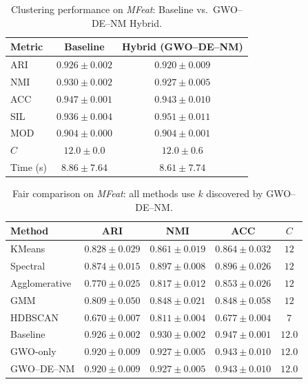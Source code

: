 \begin{table}[htbp]
\centering
\caption{Clustering performance on \textit{MFeat}: Baseline vs.\ GWO--DE--NM Hybrid.}
\label{tab:mfeat}
\begin{tabular}{lcc}
\toprule
Metric & Baseline & Hybrid (GWO--DE--NM) \\
\midrule
ARI & $\mathbf{0.926 \pm 0.002}$ & $0.920 \pm 0.009$ \\
NMI & $\mathbf{0.930 \pm 0.002}$ & $0.927 \pm 0.005$ \\
ACC & $\mathbf{0.947 \pm 0.001}$ & $0.943 \pm 0.010$ \\
SIL & $0.936 \pm 0.004$ & $\mathbf{0.951 \pm 0.011}$ \\
MOD & $0.904 \pm 0.000$ & $\mathbf{0.904 \pm 0.001}$ \\
\midrule
$C$ & $12.0 \pm 0.0$ & $12.0 \pm 0.6$ \\
Time (s) & $8.86 \pm 7.64$ & $8.61 \pm 7.74$ \\
\bottomrule
\end{tabular}
\end{table}

\begin{table}[htbp]
\centering\small
\caption{Fair comparison on \textit{MFeat}: all methods use $k$ discovered by GWO--DE--NM.}
\label{tab:fair_mfeat}
\begin{tabular}{lcccc}
\toprule
Method & ARI & NMI & ACC & $C$ \\
\midrule
KMeans & $0.828 \pm 0.029$ & $0.861 \pm 0.019$ & $0.864 \pm 0.032$ & $12$ \\
Spectral & $0.874 \pm 0.015$ & $0.897 \pm 0.008$ & $0.896 \pm 0.026$ & $12$ \\
Agglomerative & $0.770 \pm 0.025$ & $0.817 \pm 0.012$ & $0.853 \pm 0.026$ & $12$ \\
GMM & $0.809 \pm 0.050$ & $0.848 \pm 0.021$ & $0.848 \pm 0.058$ & $12$ \\
HDBSCAN & $0.670 \pm 0.007$ & $0.811 \pm 0.004$ & $0.677 \pm 0.004$ & $7$ \\
\midrule
Baseline & $\mathbf{0.926 \pm 0.002}$ & $0.930 \pm 0.002$ & $0.947 \pm 0.001$ & $12.0$ \\
GWO-only & $0.920 \pm 0.009$ & $0.927 \pm 0.005$ & $0.943 \pm 0.010$ & $12.0$ \\
GWO--DE--NM & $0.920 \pm 0.009$ & $0.927 \pm 0.005$ & $0.943 \pm 0.010$ & $12.0$ \\
\bottomrule
\end{tabular}
\end{table}

